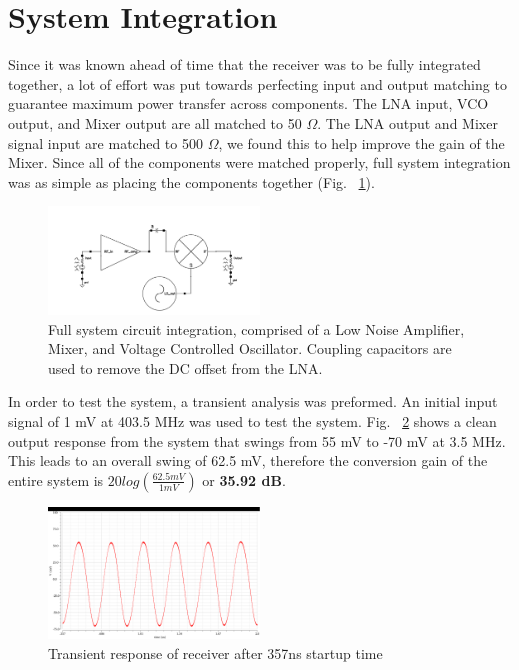 \section{System Integration}
Since it was known ahead of time that the receiver was to be fully integrated together, a lot of effort was put towards perfecting input and output matching to guarantee maximum power transfer across components. The LNA input, VCO output, and Mixer output are all matched to 50 $\Omega$. The LNA output and Mixer signal input are matched to 500 $\Omega$, we found this to help improve the gain of the Mixer. Since all of the components were matched properly, full system integration was as simple as placing the components together (Fig. ~\ref{fig:fullsystem}). 

\begin{figure}[h]
   \centering
    \includegraphics[width=0.5\textwidth]{figures/FullSystem.png}
    \caption{Full system circuit integration, comprised of a Low Noise Amplifier, Mixer, and Voltage Controlled Oscillator. Coupling capacitors are used to remove the DC offset from the LNA. }
    \label{fig:fullsystem}
\end{figure}

In order to test the system, a transient analysis was preformed. An initial input signal of 1 mV at 403.5 MHz was used to test the system. Fig. ~\ref{fig:fullsystemtrans} shows a clean output response from the system that swings from 55 mV to -70 mV at 3.5 MHz. This leads to an overall swing of 62.5 mV, therefore the conversion gain of the entire system is $20log(\frac{62.5 mV}{1 mV})$ or {\bf 35.92 dB}.

\begin{figure}[h]
   \centering
    \includegraphics[width=0.5\textwidth]{figures/FullSystemTrans}
    \caption{Transient response of receiver after 357ns startup time}
    \label{fig:fullsystemtrans}
\end{figure}

